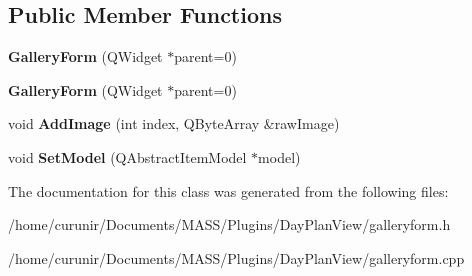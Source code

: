 \subsection*{Public Member Functions}
\begin{DoxyCompactItemize}
\item 
{\bfseries Gallery\+Form} (Q\+Widget $\ast$parent=0)\hypertarget{class_gallery_form_ac733697191bca916d42a2a2cf8370f29}{}\label{class_gallery_form_ac733697191bca916d42a2a2cf8370f29}

\item 
{\bfseries Gallery\+Form} (Q\+Widget $\ast$parent=0)\hypertarget{class_gallery_form_ac733697191bca916d42a2a2cf8370f29}{}\label{class_gallery_form_ac733697191bca916d42a2a2cf8370f29}

\item 
void {\bfseries Add\+Image} (int index, Q\+Byte\+Array \&raw\+Image)\hypertarget{class_gallery_form_adadbe8dca87679d1c3a8e9a85abc8ef7}{}\label{class_gallery_form_adadbe8dca87679d1c3a8e9a85abc8ef7}

\item 
void {\bfseries Set\+Model} (Q\+Abstract\+Item\+Model $\ast$model)\hypertarget{class_gallery_form_a2aa9632ee68fed9318a34cffc6ab3402}{}\label{class_gallery_form_a2aa9632ee68fed9318a34cffc6ab3402}

\end{DoxyCompactItemize}


The documentation for this class was generated from the following files\+:\begin{DoxyCompactItemize}
\item 
/home/curunir/\+Documents/\+M\+A\+S\+S/\+Plugins/\+Day\+Plan\+View/galleryform.\+h\item 
/home/curunir/\+Documents/\+M\+A\+S\+S/\+Plugins/\+Day\+Plan\+View/galleryform.\+cpp\end{DoxyCompactItemize}
